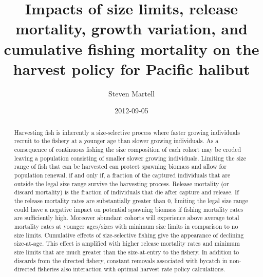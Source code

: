\documentclass[12pt]{article}
\title{Impacts of size limits, release mortality, growth variation, and cumulative fishing mortality on the harvest policy for Pacific halibut}
\author{ Steven Martell }
\date{2012-09-05}
\begin{document}
\ifpdf
{}
\else
{}
\fi


\maketitle

\begin{abstract}
	Harvesting fish is inherently a size-selective process where faster growing individuals recruit to the fishery at a younger age than slower growing individuals.  As a consequence of continuous fishing the size composition of each cohort may be eroded leaving a population consisting of smaller slower growing individuals.  Limiting the size range of fish that can be harvested can protect spawning biomass and allow for population renewal, if and only if, a fraction of the captured individuals that are outside the legal size range survive the harvesting process.  Release mortality (or discard mortality) is the fraction of individuals that die after capture and release.  If the release mortality rates are substantially greater than 0, limiting the legal size range could have a negative impact on potential spawning biomass if fishing mortality rates are sufficiently high.  Moreover abundant cohorts will experience above average total mortality rates at younger ages/sizes with minimum size limits in comparison to no size limits.  Cumulative effects of size-selective fishing give the appearance of declining size-at-age.  This effect is amplified with higher release mortality rates and minimum size limits that are much greater than the size-at-entry to the fishery.  In addition to discards from the directed fishery, constant removals associated with bycatch in non-directed fisheries also interaction with optimal harvest rate policy calculations.
	
\end{abstract}









\appendix


\end{document}
